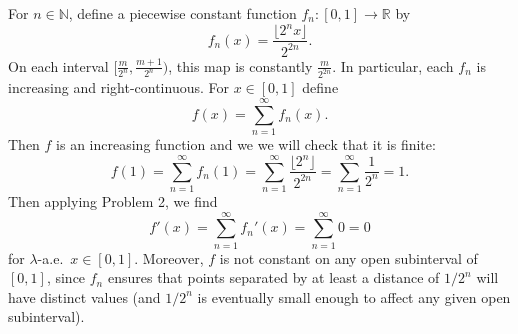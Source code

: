 \documentclass[12pt]{article}
\theoremstyle{definition}
\newcommand{\N}{\mathbb{N}}
\newcommand{\R}{\mathbb{R}}
\newcommand{\<}{\langle}
\renewcommand{\>}{\rangle}
\begin{document}
For $n \in \N$, define a piecewise constant function $f_n : [0, 1] \to \R$ by
\[
    f_n(x) = \frac{\lfloor 2^nx \rfloor}{2^{2n}}.
\]
On each interval $[\frac{m}{2^n}, \frac{m+1}{2^n})$, this map is constantly $\frac{m}{2^{2n}}$.
In particular, each $f_n$ is increasing and right-continuous.
For $x \in [0, 1]$ define
\[
    f(x) = \sum_{n=1}^{\infty} f_n(x).
\]
Then $f$ is an increasing function and we we will check that it is finite:
\[
    f(1)
        = \sum_{n=1}^{\infty} f_n(1)
        = \sum_{n=1}^{\infty} \frac{\lfloor 2^n \rfloor}{2^{2n}}
        = \sum_{n=1}^{\infty} \frac{1}{2^n}
        = 1.
\]
Then applying Problem 2, we find
\[
    f'(x)
        = \sum_{n=1}^{\infty} f_n'(x)
        = \sum_{n=1}^{\infty} 0
        = 0
\]
for $\lambda$-a.e.\ $x \in [0, 1]$.
Moreover, $f$ is not constant on any open subinterval of $[0, 1]$, since $f_n$ ensures that points separated by at least a distance of $1/2^n$ will have distinct values (and $1/2^n$ is eventually small enough to affect any given open subinterval).
\end{document}
